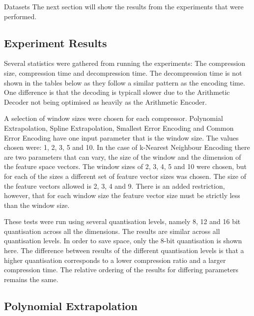 \documentclass[a4paper,11pt]{report}
\begin{document}
\begin{section}{Datasets}
The next section will show the results from the experiments that were performed.

\section{Experiment Results}

Several statistics were gathered from running the experiments: The compression size, compression time and decompression time. The decompression time is not shown in the tables below as they follow a similar pattern as the encoding time. One difference is that the decoding is typicall slower due to the Arithmetic Decoder not being optimised as heavily as the Arithmetic Encoder. 

A selection of window sizes were chosen for each compressor. Polynomial Extrapolation, Spline Extrapolation, Smallest Error Encoding and Common Error Encoding have one input parameter that is the window size. The values chosen were: 1, 2, 3, 5 and 10. In the case of k-Nearest Neighbour Encoding there are two parameters that can vary, the size of the window and the dimension of the feature space vectors. The window sizes of 2, 3, 4, 5 and 10 were chosen, but for each of the sizes a different set of feature vector sizes was chosen. The size of the feature vectors allowed is 2, 3, 4 and 9. There is an added restriction, however, that for each window size the feature vector size must be strictly less than the window size.

These tests were run using several quantisation levels, namely 8, 12 and 16 bit quantisation across all the dimensions. The results are similar across all quantisation levels. In order to save space, only the 8-bit quantisation is shown here. The difference between results of the different quantisation levels is that a higher quantisation corresponds to a lower compression ratio and a larger compression time. The relative ordering of the results for differing parameters remains the same.

\subsection{Polynomial Extrapolation}



\end{section}
\end{document}
